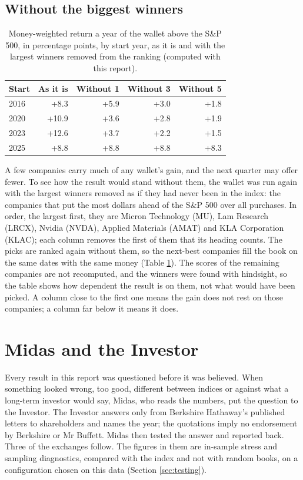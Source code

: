 \documentclass[11pt,a4paper]{article}
\begin{document}
\subsection{Without the biggest winners}
\begin{table}[H]
\centering
\small
\caption{Money-weighted return a year of the wallet above the S\&P 500, in percentage points, by start year, as it is and with the largest winners removed from the ranking (computed with this report).}\label{tab:winners}
\begin{tabular}{l r r r r}
\hline
Start & As it is & Without 1 & Without 3 & Without 5 \\
\hline
2016 & +8.3 & +5.9 & +3.0 & +1.8 \\
2020 & +10.9 & +3.6 & +2.8 & +1.9 \\
2023 & +12.6 & +3.7 & +2.2 & +1.5 \\
2025 & +8.8 & +8.8 & +8.8 & +8.3 \\
\hline
\end{tabular}
\end{table}
A few companies carry much of any wallet's gain, and the next quarter may offer fewer. To see how the result would stand without them, the wallet was run again with the largest winners removed as if they had never been in the index: the companies that put the most dollars ahead of the S\&P 500 over all purchases. In order, the largest first, they are Micron Technology (MU), Lam Research (LRCX), Nvidia (NVDA), Applied Materials (AMAT) and KLA Corporation (KLAC); each column removes the first of them that its heading counts. The picks are ranked again without them, so the next-best companies fill the book on the same dates with the same money (Table \ref{tab:winners}). The scores of the remaining companies are not recomputed, and the winners were found with hindsight, so the table shows how dependent the result is on them, not what would have been picked. A column close to the first one means the gain does not rest on those companies; a column far below it means it does.

\section{Midas and the Investor}
\label{sec:dialogue}
Every result in this report was questioned before it was believed. When something looked wrong, too good, different between indices or against what a long-term investor would say, Midas, who reads the numbers, put the question to the Investor. The Investor answers only from Berkshire Hathaway's published letters to shareholders and names the year; the quotations imply no endorsement by Berkshire or Mr Buffett. Midas then tested the answer and reported back. Three of the exchanges follow. The figures in them are in-sample stress and sampling diagnostics, compared with the index and not with random books, on a configuration chosen on this data (Section \ref{sec:testing}).
\end{document}
